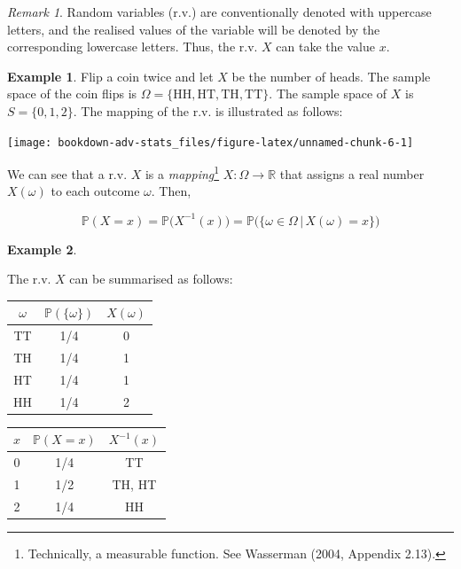 \documentclass[
]{book}
\newcommand{\bbR}{\mathbb{R}}
\newcommand{\bbP}{\mathbb{P}}
\theoremstyle{definition}
\theoremstyle{definition}
\newtheorem{example}{Example}[chapter]
\theoremstyle{definition}
\theoremstyle{definition}
\theoremstyle{remark}
\newtheorem*{remark}{Remark}
\begin{document}
\begin{remark}
Random variables (r.v.) are conventionally denoted with uppercase letters, and the realised values of the variable will be denoted by the corresponding lowercase letters. Thus, the r.v. \(X\) can take the value \(x\).
\end{remark}

\begin{example}

Flip a coin twice and let \(X\) be the number of heads.
The sample space of the coin flips is \(\Omega = \{\text{HH}, \text{HT}, \text{TH}, \text{TT} \}\).
The sample space of \(X\) is \(S = \{0,1,2 \}\).
The mapping of the r.v. is illustrated as follows:

\begin{center}\texttt{[image: bookdown-adv-stats\_files/figure-latex/unnamed-chunk-6-1]} \end{center}

\end{example}

We can see that a r.v. \(X\) is a \emph{mapping}\footnote{Technically, a measurable function. See Wasserman (2004, Appendix 2.13).} \(X:\Omega \to \bbR\) that assigns a real number \(X(\omega)\) to each outcome \(\omega\). Then,

\[
  \bbP(X=x) = \bbP\big(X^{-1}(x)\big) = \bbP\big(\{ \omega \in \Omega \,|\, X(\omega) = x\} \big)
\]

\begin{example}
\protect\hypertarget{exm:coinflip}{}\label{exm:coinflip}

The r.v. \(X\) can be summarised as follows:

\begin{longtable}[]{@{}ccc@{}}
\toprule
\(\omega\) & \(\bbP(\{\omega\})\) & \(X(\omega)\) \\
\midrule
\endhead
TT & 1/4 & 0 \\
TH & 1/4 & 1 \\
HT & 1/4 & 1 \\
HH & 1/4 & 2 \\
\bottomrule
\end{longtable}

\begin{longtable}[]{@{}ccc@{}}
\toprule
\(x\) & \(\bbP(X = x)\) & \(X^{-1}(x)\) \\
\midrule
\endhead
0 & 1/4 & TT \\
1 & 1/2 & TH, HT \\
2 & 1/4 & HH \\
\bottomrule
\end{longtable}

\end{example}
\end{document}
